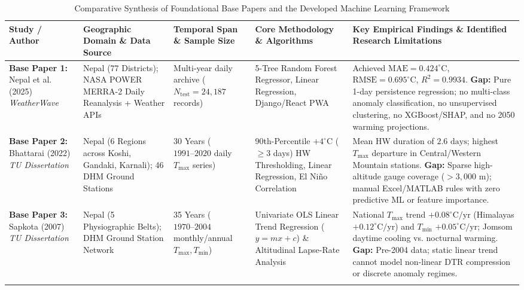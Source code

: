 \documentclass[conference]{IEEEtran}
\begin{document}
\begin{table}[!t]
\centering
\caption{Comparative Synthesis of Foundational Base Papers and the Developed Machine Learning Framework}
\label{tab:lit_comparison}
\footnotesize
\setlength{\tabcolsep}{4.5pt}
\renewcommand{\arraystretch}{1.18}
\begin{tabularx}{\textwidth}{p{2.3cm} p{2.4cm} p{2.5cm} p{2.8cm} X}
\toprule
\textbf{Study / Author} & \textbf{Geographic Domain \& Data Source} & \textbf{Temporal Span \& Sample Size} & \textbf{Core Methodology \& Algorithms} & \textbf{Key Empirical Findings \& Identified Research Limitations} \\
\midrule
\textbf{Base Paper 1:} Nepal et al. (2025) \textit{WeatherWave} \cite{nepal2025} & Nepal (77 Districts); NASA POWER MERRA-2 Daily Reanalysis + Weather APIs & Multi-year daily archive ($N_{\text{test}} = 24,187$ records) & 5-Tree Random Forest Regressor, Linear Regression, Django/React PWA & Achieved $\text{MAE} = 0.424^\circ\text{C}$, $\text{RMSE} = 0.695^\circ\text{C}$, $R^2 = 0.9934$. \textbf{Gap:} Pure 1-day persistence regression; no multi-class anomaly classification, no unsupervised clustering, no XGBoost/SHAP, and no 2050 warming projections. \\
\addlinespace[3pt]
\textbf{Base Paper 2:} Bhattarai (2022) \textit{TU Dissertation} \cite{bhattarai2022} & Nepal (6 Regions across Koshi, Gandaki, Karnali); 46 DHM Ground Stations & 30 Years ($1991\text{--}2020$ daily $T_{\max}$ series) & 90th-Percentile $+ 4^\circ\text{C}$ ($\ge 3$ days) HW Thresholding, Linear Regression, El Ni\~no Correlation & Mean HW duration of $2.6\text{ days}$; highest $T_{\max}$ departure in Central/Western Mountain stations. \textbf{Gap:} Sparse high-altitude gauge coverage ($>3,000\text{ m}$); manual Excel/MATLAB rules with zero predictive ML or feature importance. \\
\addlinespace[3pt]
\textbf{Base Paper 3:} Sapkota (2007) \textit{TU Dissertation} \cite{sapkota2007} & Nepal (5 Physiographic Belts); DHM Ground Station Network & 35 Years ($1970\text{--}2004$ monthly/annual $T_{\max}, T_{\min}$) & Univariate OLS Linear Trend Regression ($y=mx+c$) \& Altitudinal Lapse-Rate Analysis & National $T_{\max}$ trend $+0.08^\circ\text{C/yr}$ (Himalayas $+0.12^\circ\text{C/yr}$) and $T_{\min}$ $+0.05^\circ\text{C/yr}$; Jomsom daytime cooling vs. nocturnal warming. \textbf{Gap:} Pre-2004 data; static linear trend cannot model non-linear DTR compression or discrete anomaly regimes. \\
\addlinespace[3pt]

\end{tabularx}
\end{table}
\end{document}
